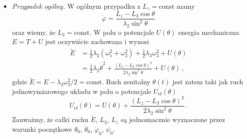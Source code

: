 \documentclass[../main.tex]{subfiles}
\begin{document}
\begin{itemize}
    \item \textit{Przypadek ogólny.} W ogólnym przypadku z \(L_z=\text{const}\) mamy
    \begin{equation*}
        \dot\varphi=\frac{L_z-L_3\cos\theta}{\lambda_2\sin^2\theta}
    \end{equation*}
    oraz wiemy, że \(L_3=\text{const}\). W polu o potencjale \(U(\theta)\) energia mechaniczna \(E=T+U\) jest oczywiście zachowana i wynosi
    \begin{equation*}
    \begin{split}
        \widetilde{E}&=\frac{1}{2}\lambda_2(\omega_1^2+\omega_2^2)+\frac{1}{2}\lambda_3\omega_3^2+U(\theta)\\
        &=\frac{1}{2}\lambda_2\dot{\theta}^2+\frac{(L_z-L_3\cos\theta)^2}{2\lambda_2\sin^2\theta}+U(\theta)\,,
    \end{split}
    \end{equation*}
    gdzie \(\widetilde{E}=E-\lambda_3\omega_3^2/2=\text{const}\). Ruch zenitalny \(\theta(t)\) jest zatem taki jak ruch jednowymiarowego układu w polu o potencjale \(U_\text{ef}(\theta)\)
    \begin{equation*}
        U_\text{ef}(\theta)=U(\theta)+\frac{(L_z-L_3\cos\theta)^2}{2\lambda_2\sin^2\theta}\,.
    \end{equation*}
    Zauważmy, że całki ruchu \(\widetilde{E}\), \(L_3\), \(L_z\) są jednoznacznie wyznaczone przez warunki początkowe \(\theta_0\), \(\dot{\theta}_0\), \(\dot{\varphi}_0\), \(\dot{\psi}_0\). 
    \medskip
    

\end{itemize}
\end{document}
